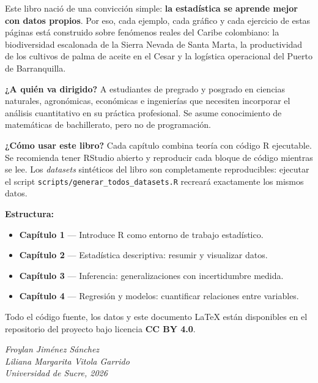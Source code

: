 \documentclass[
  10pt,           %
  twoside,        %
  openright       %
]{book}
\begin{document}
Este libro nació de una convicción simple: \textbf{la estadística se aprende mejor con datos propios}.
Por eso, cada ejemplo, cada gráfico y cada ejercicio de estas páginas está construido sobre
fenómenos reales del Caribe colombiano: la biodiversidad escalonada de la Sierra Nevada de
Santa Marta, la productividad de los cultivos de palma de aceite en el Cesar y la logística
operacional del Puerto de Barranquilla.

\medskip

\textbf{¿A quién va dirigido?} A estudiantes de pregrado y posgrado en ciencias naturales,
agronómicas, económicas e ingenierías que necesiten incorporar el análisis cuantitativo en su
práctica profesional. Se asume conocimiento de matemáticas de bachillerato, pero no de programación.

\medskip

\textbf{¿Cómo usar este libro?} Cada capítulo combina teoría con código R ejecutable.
Se recomienda tener RStudio abierto y reproducir cada bloque de código mientras se lee.
Los \emph{datasets} sintéticos del libro son completamente reproducibles: ejecutar el script
\texttt{scripts/generar\_todos\_datasets.R} recreará exactamente los mismos datos.

\medskip

\textbf{Estructura:}
\begin{itemize}
  \item \textbf{Capítulo 1} — Introduce R como entorno de trabajo estadístico.
  \item \textbf{Capítulo 2} — Estadística descriptiva: resumir y visualizar datos.
  \item \textbf{Capítulo 3} — Inferencia: generalizaciones con incertidumbre medida.
  \item \textbf{Capítulo 4} — Regresión y modelos: cuantificar relaciones entre variables.
\end{itemize}

\medskip

Todo el código fuente, los datos y este documento \LaTeX{} están disponibles en el repositorio
del proyecto bajo licencia \textbf{CC BY 4.0}.

\vspace{1cm}
\begin{flushright}
  \itshape
  Froylan Jiménez Sánchez \\ Liliana Margarita Vitola Garrido\\[0.3cm]
  \small Universidad de Sucre, 2026
\end{flushright}
\end{document}
